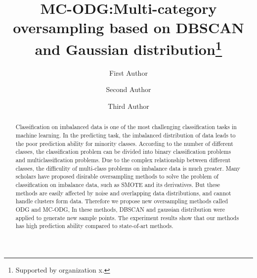 \documentclass[runningheads]{llncs}
\begin{document}
%
\title{MC-ODG:Multi-category oversampling based on DBSCAN and Gaussian distribution\thanks{Supported by organization x.}}
%
%
\author{First Author \and
Second Author \and
Third Author}
%
%
%
\maketitle              %
%
\begin{abstract}
Classification on imbalanced data is one of the most
challenging classification tasks in machine learning. 
In the predicting task,
the imbalanced distribution of data leads 
to the poor prediction ability for minority classes.
According to the number of different classes, the classification problem 
can be divided into binary classification problems and multiclassification problems. Due to 
the complex relationship between different classes,
the difficulity of multi-class problems on imbalance data 
is much greater. Many scholars have proposed disirable oversampling methods to
solve the problem of classification on imbalance data, such as SMOTE and its derivatives.
But these methods are easily affected by noise and 
overlapping data distributions, and cannot handle clusters form data.
Therefore we propose new oversampling methods called ODG and MC-ODG, In these methods,
DBSCAN and gaussian distribution were applied to generate new sample points. The experiment results
show that our methods has high prediction ability compared to state-of-art methods.

\end{abstract}
%
%
%
\end{document}
